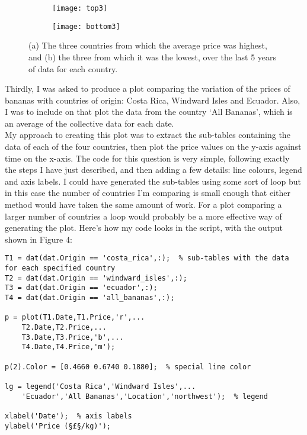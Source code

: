 \documentclass[a4paper,12pt]{article}
\begin{document}
\begin{figure}[h]
\centering
\begin{subfigure}{.5\textwidth}
  \centering
  \texttt{[image: top3]}
  \caption{}
  \label{fig:sub1}
\end{subfigure}%
\begin{subfigure}{.5\textwidth}
  \centering
  \texttt{[image: bottom3]}
  \caption{}
  \label{fig:sub2}
\end{subfigure}
\caption{(a) The three countries from which the average price was highest, and (b) the three from which it was the lowest, over the last 5 years of data for each country.}
\label{fig:test}
\end{figure}

Thirdly, I was asked to produce a plot comparing the variation of the prices of bananas with countries of origin: Costa Rica, Windward Isles and Ecuador. Also, I was to include on that plot the data from the country `All Bananas', which is an average of the collective data for each date. \\

My approach to creating this plot was to extract the sub-tables containing the data of each of the four countries, then plot the price values on the y-axis against time on the x-axis. The code for this question is very simple, following exactly the steps I have just described, and then adding a few details: line colours, legend and axis labels. I could have generated the sub-tables using some sort of loop but in this case the number of countries I'm comparing is small enough that either method would have taken the same amount of work. For a plot comparing a larger number of countries a loop would probably be a more effective way of generating the plot. Here's how my code looks in the script, with the output shown in Figure 4:
\newpage
\begin{lstlisting}
T1 = dat(dat.Origin == 'costa_rica',:);  % sub-tables with the data for each specified country
T2 = dat(dat.Origin == 'windward_isles',:);
T3 = dat(dat.Origin == 'ecuador',:);
T4 = dat(dat.Origin == 'all_bananas',:);

p = plot(T1.Date,T1.Price,'r',...
    T2.Date,T2.Price,...
    T3.Date,T3.Price,'b',...
    T4.Date,T4.Price,'m');

p(2).Color = [0.4660 0.6740 0.1880];  % special line color

lg = legend('Costa Rica','Windward Isles',...
    'Ecuador','All Bananas','Location','northwest');  % legend

xlabel('Date');  % axis labels
ylabel('Price (§£§/kg)');
\end{lstlisting}
\end{document}
